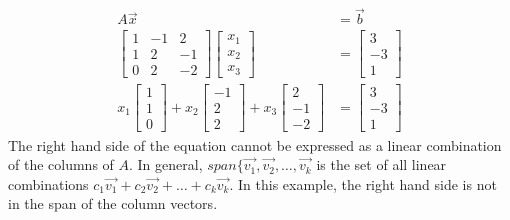 \documentclass{math}
\begin{document}
\begin{align*}
  A\vec{x} &= \vec{b} \\
  \begin{bmatrix}
    1 & -1 & 2 \\
    1 & 2 & -1 \\
    0 & 2 & -2
  \end{bmatrix}\begin{bmatrix}
    x_1 \\ x_2 \\ x_3
  \end{bmatrix} &= \begin{bmatrix}
    3 \\ -3 \\ 1
  \end{bmatrix} \\
  x_1\begin{bmatrix}1 \\ 1 \\ 0\end{bmatrix}+
    x_2\begin{bmatrix}-1 \\ 2 \\ 2\end{bmatrix}+
    x_3\begin{bmatrix}2 \\ -1 \\ -2\end{bmatrix} &=
  \begin{bmatrix}3 \\ -3 \\ 1\end{bmatrix}
\end{align*}
The right hand side of the equation cannot be expressed as a linear combination
of the columns of \( A \). In general, \(
span\{\vec{v_1},\vec{v_2},\dots,\vec{v_k} \) is the set of all linear
combinations \( c_1\vec{v_1}+c_2\vec{v_2}+\dots+c_k\vec{v_k} \). In this
example, the right hand side is not in the span of the column vectors.
\end{document}
